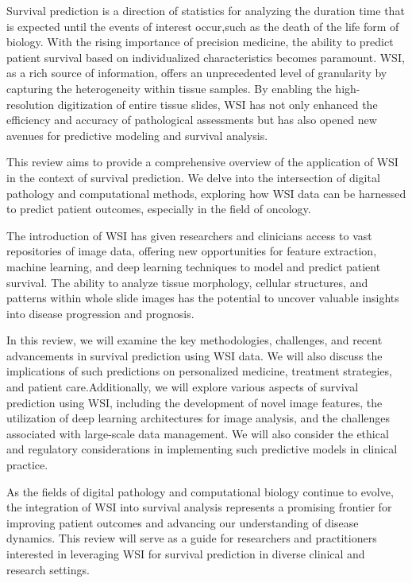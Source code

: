 \documentclass[journal,twoside,web]{ieeecolor}
\begin{document}
Survival prediction is a direction of statistics for analyzing the duration time that is expected until the events of interest occur,such as the death of the life form of biology.
With the rising importance of precision medicine, the ability to predict patient survival based on individualized characteristics becomes paramount.  WSI, as a rich source of information, offers an unprecedented level of granularity by capturing the heterogeneity within tissue samples. By enabling the high-resolution digitization of entire tissue slides, WSI has not only enhanced the efficiency and accuracy of pathological assessments but has also opened new avenues for predictive modeling and survival analysis.

This review aims to provide a comprehensive overview of the application of WSI in the context of survival prediction. We delve into the intersection of digital pathology and computational methods, exploring how WSI data can be harnessed to predict patient outcomes, especially in the field of oncology.

The introduction of WSI has given researchers and clinicians access to vast repositories of image data, offering new opportunities for feature extraction, machine learning, and deep learning techniques to model and predict patient survival. The ability to analyze tissue morphology, cellular structures, and patterns within whole slide images has the potential to uncover valuable insights into disease progression and prognosis.

In this review, we will examine the key methodologies, challenges, and recent advancements in survival prediction using WSI data. We will also discuss the implications of such predictions on personalized medicine, treatment strategies, and patient care.Additionally, we will explore various aspects of survival prediction using WSI, including the development of novel image features, the utilization of deep learning architectures for image analysis, and the challenges associated with large-scale data management.  We will also consider the ethical and regulatory considerations in implementing such predictive models in clinical practice.

As the fields of digital pathology and computational biology continue to evolve, the integration of WSI into survival analysis represents a promising frontier for improving patient outcomes and advancing our understanding of disease dynamics. This review will serve as a guide for researchers and practitioners interested in leveraging WSI for survival prediction in diverse clinical and research settings.
\end{document}
